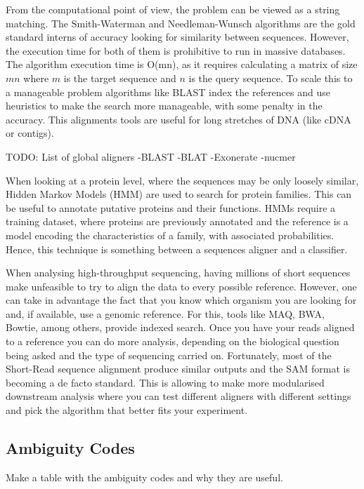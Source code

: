 From the computational point of view, the problem can be viewed as a string matching. The Smith-Waterman\cite{Smith1981} and Needleman-Wunsch\cite{Needleman1970} algorithms are the gold standard interns of accuracy looking for similarity between sequences. However, the execution time for both of them is prohibitive to run in massive databases. The algorithm execution time is O(mn), as it requires calculating a matrix of size $mn$ where $m$ is the target sequence and $n$ is the query sequence.  To scale this to a manageable problem algorithms like BLAST index the references and use heuristics to make the search more manageable, with some penalty in the accuracy. This alignments tools are useful for long stretches of DNA (like cDNA or contigs)\cite{Altschul1990}.

TODO: List of global aligners
-BLAST
-BLAT
-Exonerate
-nucmer


When looking at a protein level, where the sequences may be only loosely similar, Hidden Markov Models (HMM) are used to search for protein families. This can be useful to annotate putative proteins and their functions. HMMs require a training dataset, where proteins are previously annotated and the reference is a model encoding the characteristics of a family, with associated probabilities. Hence, this technique is something between a sequences aligner and a classifier\cite{Eddy2004}. 

When analysing high-throughput sequencing, having millions of short sequences make unfeasible to try to align the data to every possible reference. However, one can take in advantage the fact that you know which organism you are looking for and, if available, use a genomic reference. For this, tools like MAQ, BWA, Bowtie, among others, provide indexed search.  Once you have your reads aligned to a reference you can do more analysis, depending on the biological question being asked and the type of sequencing carried on.  Fortunately, most of the Short-Read sequence alignment produce similar outputs and the SAM format is becoming a de facto standard. This is allowing to make more modularised downstream analysis where you can test different aligners with different settings and pick the algorithm that better fits your experiment\cite{Liu2012,Li2009,Li2009a}. 

\subsection{Ambiguity Codes}
\label{lit:ambiguity}
Make a table with the ambiguity codes and why they are useful. 



